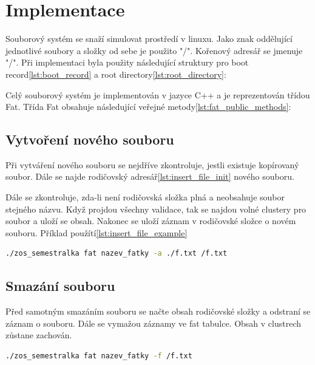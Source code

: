 \documentclass{report}
\begin{document}
\chapter*{Implementace}
Souborový systém se snaží simulovat prostředí v linuxu. Jako znak oddělující jednotlivé soubory a složky od sebe je použito "/". Kořenový adresář se jmenuje "/". Při implementaci byla použity následující struktury pro boot record\ref{lst:boot_record} a root directory\ref{lst:root_directory}:


Celý souborový systém je implementován v jazyce C++ a je reprezentován třídou Fat. Třída Fat obsahuje následující veřejné metody\ref{lst:fat_public_methods}:


\section*{Vytvoření nového souboru}
Při vytváření nového souboru se nejdříve zkontroluje, jestli existuje kopírovaný soubor. Dále se najde rodičovský adresář\ref{lst:insert_file_init} nového souboru.

Dále se zkontroluje, zda-li není rodičovská složka plná a neobsahuje soubor stejného názvu. Když projdou všechny validace, tak se najdou volné clustery pro soubor a uloží se obsah. Nakonec se uloží záznam v rodičovské složce o novém souboru. Příklad použítí\ref{lst:insert_file_example}
\begin{lstlisting}[caption=Vytvoření nového souboru,label=lst:insert_file_example, language=bash]
./zos_semestralka fat nazev_fatky -a ./f.txt /f.txt
 \end{lstlisting}

\section*{Smazání souboru}
Před samotným smazáním souboru se načte obsah rodičovské složky a odstraní se záznam o souboru. Dále se vymažou záznamy ve fat tabulce. Obsah v clustrech zůstane zachován.
\begin{lstlisting}[caption=Smazání souboru,label=lst:delete_file_example, language=bash]
./zos_semestralka fat nazev_fatky -f /f.txt
 \end{lstlisting}
\end{document}
